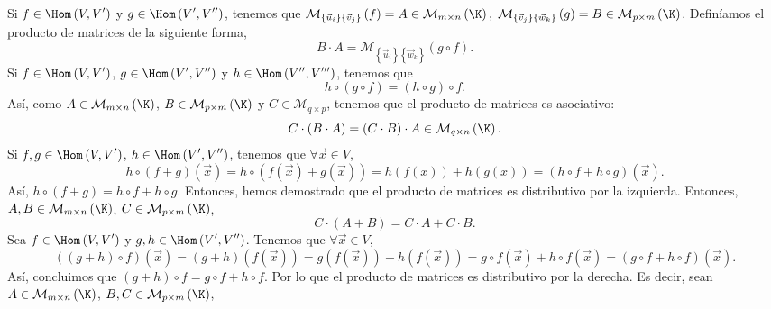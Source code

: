 	Si $\displaystyle f \in \Hom\left(V, V'\right) $ y $\displaystyle g \in \Hom\left(V', V''\right) $, tenemos que $\displaystyle \mathcal{M}_{ \left\{ \vec{u}_{i}\right\} \left\{ \vec{v}_{j}\right\} }\left(f\right) = A \in \mathcal{M}_{ m \times n}\left(\K\right), \; \mathcal{M}_{ \left\{ \vec{v}_{j}\right\} \left\{ \vec{w}_{k}\right\}  }\left(g\right) = B \in \mathcal{M}_{p \times m}\left(\K\right)$. Definíamos el producto de matrices de la siguiente forma, 
			\[ B \cdot A = \mathcal{M}_{ \left\{ \vec{u}_{i}\right\} \left\{ \vec{w}_{k}\right\}}\left(g\circ f\right).\]
Si $\displaystyle f \in \Hom\left(V,V'\right) $, $\displaystyle g \in \Hom\left(V', V''\right) $ y $\displaystyle h \in \Hom\left(V'', V'''\right) $, tenemos que 
\[h \circ \left(g \circ f\right) = \left(h \circ g\right) \circ f .\]
Así, como $\displaystyle A \in \mathcal{M}_{m \times n}\left(\K\right) $, $\displaystyle B \in \mathcal{M}_{p \times m}\left(\K\right) $ y $\displaystyle C \in \mathcal{M}_{q \times p} $, tenemos que el producto de matrices es asociativo:
\[ C \cdot \left(B \cdot A\right) = \left(C \cdot B\right) \cdot A \in \mathcal{M}_{q \times n}\left(\K\right) .\]
Si $\displaystyle f,g \in \Hom\left(V, V'\right) $, $\displaystyle h \in \Hom\left(V', V''\right) $, tenemos que $\displaystyle \forall \vec{x} \in V $,
\[h \circ \left(f + g\right)\left(\vec{x}\right) = h \circ \left(f\left(\vec{x}\right) + g\left(\vec{x}\right)\right) = h\left(f\left(x\right)\right) + h\left(g\left(x\right)\right) = \left(h\circ f + h\circ g\right)\left(\vec{x}\right) .\]
Así, $\displaystyle h \circ \left(f+g\right) = h \circ f + h \circ g $. Entonces, hemos demostrado que el producto de matrices es distributivo por la izquierda. Entonces, $\displaystyle A, B \in \mathcal{M}_{m \times n} \left(\K\right)$, $\displaystyle C \in \mathcal{M}_{p\times m}\left(\K\right) $,
\[C \cdot \left(A + B \right) = C \cdot A + C \cdot B .\]
Sea $\displaystyle f \in \Hom\left(V,V'\right) $ y $\displaystyle g, h \in \Hom\left(V',V''\right) $. Tenemos que $\displaystyle \forall\vec{x} \in V $,
\[\left(\left(g+h\right)\circ f\right)\left(\vec{x}\right) = \left(g+h\right)\left(f\left(\vec{x}\right)\right) = g\left(f\left(\vec{x}\right)\right)+h\left(f\left(\vec{x}\right)\right) = g\circ f\left(\vec{x}\right) + h \circ f\left(\vec{x}\right)=\left(g \circ f + h \circ f\right)\left(\vec{x}\right) .\]
Así, concluimos que $\displaystyle \left(g+h\right)\circ f = g\circ f + h \circ f $. Por lo que el producto de matrices es distributivo por la derecha. Es decir, sean $\displaystyle A \in \mathcal{M}_{m \times n}\left(\K\right) $, $\displaystyle B,C \in \mathcal{M}_{p \times m}\left(\K\right) $, 
